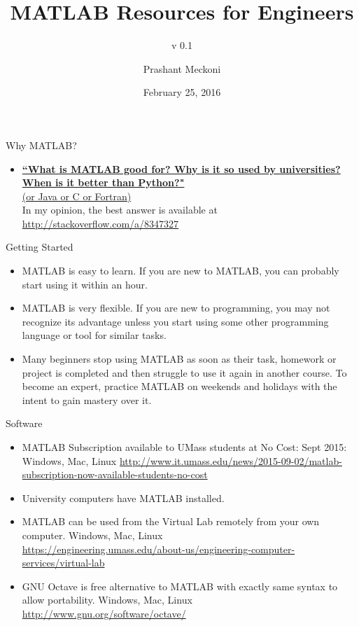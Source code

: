 \documentclass[10pt]{beamer}
\author[Prashant Meckoni]{Prashant Meckoni}
\title[MATLAB Resources]{MATLAB Resources for Engineers}
\subtitle[v 0.1]{v 0.1}
\institute[UMass Amherst]{Mechanical \& Industrial Engineering, \\University of Massachusetts, Amherst }
\date{February 25, 2016}
\begin{document}
\begin{frame}
\titlepage
\end{frame}
\begin{frame}{Why MATLAB?}
\begin{itemize}
\item \href{http://stackoverflow.com/q/179904}{\textbf{``What is MATLAB good for? Why is it so used by universities? When is it better than Python?"} \\(or Java or C or Fortran)}\\ 
In my opinion, the best answer is available at\\ \url{http://stackoverflow.com/a/8347327}
\end{itemize}
\end{frame}
\begin{frame}{Getting Started}
\begin{itemize}
\item MATLAB is easy to learn. If you are new to MATLAB, you can probably start using it within an hour.
\item MATLAB is very flexible. If you are new to programming, you may not recognize its advantage unless you start using some other programming language or tool for similar tasks.
\item Many beginners stop using MATLAB as soon as their task, homework or project is completed and then struggle to use it again in another course. To become an expert, practice MATLAB on weekends and holidays with the intent to gain mastery over it.
\end{itemize}
\end{frame}
\begin{frame}{Software}
\begin{itemize}
\item MATLAB Subscription available to UMass students at No Cost: Sept 2015: Windows, Mac, Linux \url{http://www.it.umass.edu/news/2015-09-02/matlab-subscription-now-available-students-no-cost} 
\item University computers have MATLAB installed.
\item MATLAB can be used from the Virtual Lab remotely from your own computer. Windows, Mac, Linux\\ \url{https://engineering.umass.edu/about-us/engineering-computer-services/virtual-lab}
\item GNU Octave is free alternative to MATLAB with exactly same syntax to allow portability. Windows, Mac, Linux \url{http://www.gnu.org/software/octave/} 
\end{itemize}
\end{frame}
\end{document}
